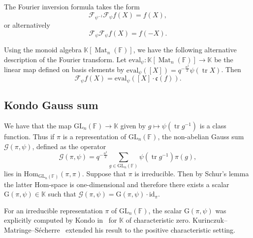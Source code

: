 \documentclass[12pt, reqno]{amsart}
\theoremstyle{definition}
\newcommand{\coefficientsField}{\mathbb{K}}
\newcommand{\Hom}{\mathrm{Hom}}
\newcommand{\idmap}{\mathrm{id}}
\newcommand{\fieldCharacter}{\psi}
\newcommand{\trace}{\operatorname{tr}}
\newcommand{\GL}{\mathrm{GL}}
\newcommand{\finiteField}{\mathbb{F}}
\newcommand{\squareMatrix}{\operatorname{Mat}}
\newcommand{\GaussSum}[2]{\mathcal{G}\left(#1, #2\right)}
\newcommand{\fourierTransform}[1]{\mathcal{F}_{#1}}
\newcommand{\GaussSumScalar}[2]{\mathrm{G}\left(#1, #2\right)}
\newcommand{\evaluation}{\mathrm{eval}}
\newcommand{\algebraIsomorphism}{\mathfrak{c}}
\begin{document}
The Fourier inversion formula takes the form
\begin{displaymath}
\fourierTransform{\fieldCharacter^{-1}} \fourierTransform{\fieldCharacter} f\left(X\right) = f\left(X\right),
\end{displaymath}
or alternatively
\begin{displaymath}
\fourierTransform{\fieldCharacter} \fourierTransform{\fieldCharacter} f\left(X\right) = f\left(-X\right).
\end{displaymath}

Using the monoid algebra $\coefficientsField\left[\squareMatrix_n\left(\finiteField\right)\right]$, we have the following alternative description of the Fourier transform. Let $\evaluation_{\fieldCharacter} \colon \coefficientsField\left[\squareMatrix_n\left(\finiteField\right)\right] \to \coefficientsField$ be the linear map defined on basis elements by $\evaluation_{\fieldCharacter}\left(\left[X\right]\right) = q^{-\frac{n^2}{2}} \fieldCharacter\left(\trace X\right)$. Then
\begin{displaymath}
\fourierTransform{\fieldCharacter}f\left(X\right) = \evaluation_{\fieldCharacter}\left(\left[X\right] \cdot \algebraIsomorphism\left(f\right)\right).
\end{displaymath}

\subsection{Kondo Gauss sum}\label{subsec:kondo-gauss-sum}
We have that the map $\GL_n\left(\finiteField\right) \to \coefficientsField$ given by $g \mapsto \fieldCharacter\left(\trace g^{-1}\right)$ is a class function. Thus if $\pi$ is a representation of $\GL_n\left(\finiteField\right)$, the non-abelian Gauss sum $\GaussSum{\pi}{\fieldCharacter}$, defined as the operator
\begin{displaymath}
\GaussSum{\pi}{\fieldCharacter} = q^{-\frac{n^2}{2}} \sum_{g \in \GL_n\left(\finiteField\right)} \fieldCharacter\left(\trace g^{-1}\right)\pi\left(g\right),
\end{displaymath}
 lies in $\Hom_{\GL_n\left(\finiteField\right)}\left(\pi, \pi\right)$. Suppose that $\pi$ is irreducible. Then by Schur's lemma the latter Hom-space is one-dimensional and therefore there exists a scalar $\GaussSumScalar{\pi}{\fieldCharacter} \in \coefficientsField$ such that $\GaussSum{\pi}{\fieldCharacter} = \GaussSumScalar{\pi}{\fieldCharacter} \cdot \idmap_{\pi}$.

For an irreducible representation $\pi$ of $\GL_n\left(\finiteField\right)$, the scalar $\GaussSumScalar{\pi}{\fieldCharacter}$ was explicitly computed by Kondo in~\cite{Kondo1963} for $\coefficientsField$ of characteristic zero. Kurinczuk--Matringe--S{\'e}cherre~\cite[Proposition 6.1]{KurinczukMatringeSecherre2026} extended his result to the positive characteristic setting.
\end{document}
